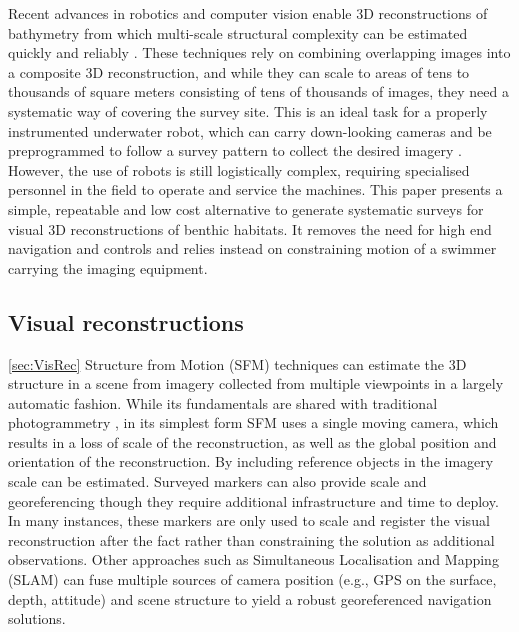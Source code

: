 \newline

Recent advances in robotics and computer vision enable 3D reconstructions of bathymetry from which multi-scale structural complexity can be estimated quickly and reliably \cite{Friedman_2012}. These techniques rely on combining overlapping images into a composite 3D reconstruction, and while they can scale to areas of tens to thousands of square meters consisting of tens of thousands of images, they need a systematic way of covering the survey site. This is an ideal task for a properly instrumented underwater robot, which can carry down-looking cameras and be preprogrammed to follow a survey pattern to collect the desired imagery \cite{Williams_2012}. However, the use of robots is still logistically complex, requiring specialised personnel in the field to operate and service the machines. 
This paper presents a simple, repeatable and low cost alternative to generate systematic surveys for visual 3D reconstructions of benthic habitats. It removes the need for high end navigation and controls and relies instead on constraining motion of a swimmer carrying the imaging equipment. 

\subsection{Visual reconstructions} \ref{sec:VisRec}
Structure from Motion (SFM) techniques \cite{Hartley_2004} can estimate the 3D structure in a scene from imagery collected from multiple viewpoints in a largely automatic fashion. While its fundamentals are shared with traditional photogrammetry \cite{Jones_1982}, in its simplest form SFM uses a single moving camera, which results in a loss of scale of the reconstruction, as well as the global position and orientation of the reconstruction. By including reference objects in the imagery scale can be estimated. Surveyed markers can also provide scale and georeferencing though they require additional infrastructure and time to deploy. In many instances, these markers are only used to scale and register the visual reconstruction after the fact rather than constraining the solution as additional observations.
Other approaches such as Simultaneous Localisation and Mapping (SLAM) \cite{Thrun_2008} can fuse multiple sources of camera position (e.g., GPS on the surface, depth, attitude) and scene structure to yield a robust georeferenced navigation solutions.

